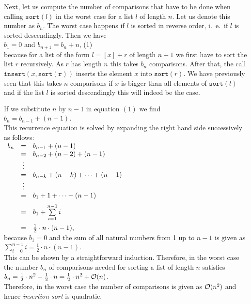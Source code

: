 Next, let us compute the number of comparisons that have to be done when calling
$\texttt{sort}(l)$ in the worst case for a list  $l$ of length $n$.  Let us denote this number as
$b_n$. The worst case happens if $l$ is sorted in reverse order, i.~e.~if $l$ is sorted
descendingly.   
Then we have \\[0.2cm]
\hspace*{1.3cm}
 $b_1 = 0$ \quad and \quad $b_{n+1} = b_n + n$, \hspace*{\fill} (1)
\\[0.2cm]
because for a list of the form $l = [x] + r$ of length $n+1$ we first have to sort the list $r$
recursively.  As $r$ has length $n$ this takes $b_n$ comparisons.  After that, the call
$\mathtt{insert}(x, \mathtt{sort(r)})$ 
inserts the element $x$ into $\mathtt{sort}(r)$.  We have previously seen that this takes $n$
comparisons if $x$ is bigger than all elements of $\mathtt{sort}(l)$ and if the list $l$ is sorted
descendingly this will indeed be the case.

If we substitute $n$ by $n-1$ in equation $(1)$ we find
\\[0.2cm]
\hspace*{1.3cm}
$b_n = b_{n-1} + (n - 1)$.
\\[0.2cm]
This recurrence equation is solved by expanding the right hand side successively as follows:
\\[0.2cm]
\hspace*{1.3cm}
$
\begin{array}[t]{lcl}
  b_{n} & = & b_{n-1} + (n - 1)                     \\ 
        & = & b_{n-2} + (n - 2) + (n - 1)           \\ 
        & \vdots &                                  \\
        & = & b_{n-k} + (n - k) + \cdots + (n - 1)  \\ 
        & \vdots &                                  \\
        & = & b_{1} + 1 + \cdots + (n - 1)      \\[0.2cm] 
        & = & b_{1} + \sum\limits_{i = 1}^{n - 1} i \\[0.4cm]
        & = & \frac{1}{2} \cdot n \cdot (n - 1),
\end{array}
$
\\[0.2cm]
because $b_1 = 0$ and the sum of all natural numbers from 1 up to  $n - 1$ is given as
\\[0.2cm]
\hspace*{1.3cm}
$\sum\limits_{i = 0}^{n - 1} i  = \frac{1}{2} \cdot n \cdot (n - 1)$.
\\[0.2cm]
This can be shown by a straightforward induction.  Therefore, in the worst case the number $b_n$ of
comparisons needed for sorting a list of length $n$  satisfies 
\\[0.2cm]
\hspace*{1.3cm}
$b_n = \frac{1}{2} \cdot n^2 - \frac{1}{2} \cdot n = \frac{1}{2} \cdot n^2 + \mathcal{O}(n)$.
\\[0.2cm]
Therefore, in the worst case the number of comparisons is given as $\mathcal{O}(n^2)$ and hence
\emph{insertion sort} is quadratic.


